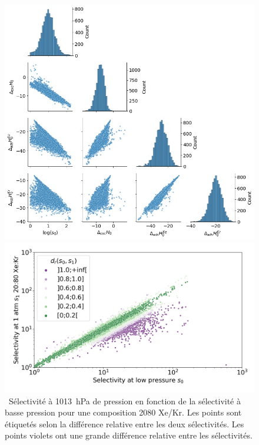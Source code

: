 \documentclass[thesis]{subfiles}
\begin{document}
\begin{otherlanguage}{french}
\begin{figure}[h]
\begin{minipage}[t]{.43\textwidth}
\centering
  \includegraphics[width=\linewidth]{figures/2-thermo/Enthalpy_0_log.jpg}
  \caption{\small{\ Pour 8401 MOFs avec une sélectivité Xe/Kr favorable ($s\e{0} > 1$), pair-plots entre les différentes grandeurs $\log(s\e{0})$, $\Delta\e{exc}H\e{0}$, $\Delta\e{ads}H\ex{Xe}\e{0}$ et $\Delta\e{ads}H\ex{Kr}\e{0}$ (les enthalpies sont en \si{\kilo\joule\per\mol}) en dehors de la diagonale et la distribution de chaque grandeur sur la diagonale.}}
  \label{fgr:histo_H_resume}
\end{minipage}
\hfill
\begin{minipage}[t]{.5\textwidth}
\centering
  \includegraphics[width=\linewidth]{figures/2-thermo/s_0_vs_s_2080_overview_log.jpg}
  \caption{\small{\ Sélectivité à \SI{1013}{\hecto\pascal} de pression en fonction de la sélectivité à basse pression pour une composition 20\pp{}80 Xe/Kr. Les points sont étiquetés selon la différence relative entre les deux sélectivités. Les points violets ont une grande différence relative entre les sélectivités. }}
  \label{fgr:overview_resume}
\end{minipage}
\end{figure}


\end{otherlanguage}
\end{document}
